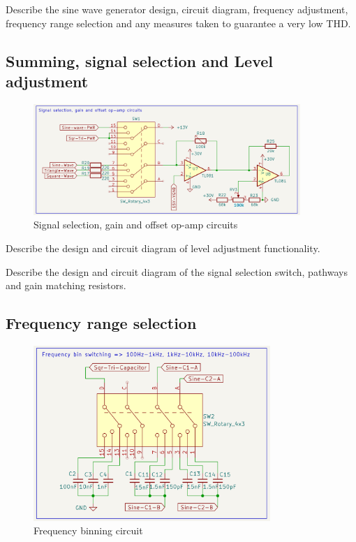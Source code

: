 \documentclass[11pt,a4paper]{article}
\begin{document}
Describe the sine wave generator design, circuit diagram, frequency adjustment, frequency range selection and any measures taken to guarantee a very low THD.

\subsection{Summing, signal selection and Level adjustment}

\begin{figure}[H]
	\begin{center}
		\includegraphics[width=0.9\textwidth]{figures/hardware/schematics/signal-gain-offset-op-amp-circuits.png}
		\caption{Signal selection, gain and offset op-amp circuits}
		\label{fig:Signal selection, gain and offset op-amp circuits}
	\end{center}
\end{figure}

Describe the design and circuit diagram of level adjustment functionality.

Describe the design and circuit diagram of the signal selection switch, pathways and gain matching resistors.

\subsection{Frequency range selection}
\begin{figure}[H]
	\begin{center}
		\includegraphics[width=0.8\textwidth]{figures/hardware/schematics/frequency-binning.png}
		\caption{Frequency binning circuit}
		\label{fig:Frequency binning circuit}
	\end{center}
\end{figure}
\end{document}
